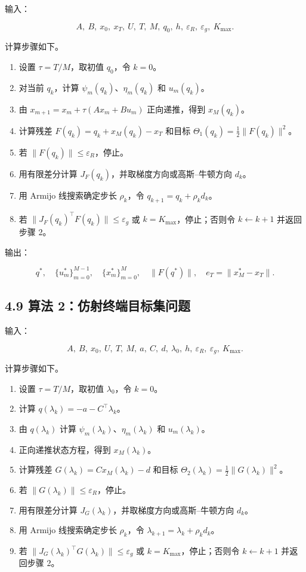 \documentclass[UTF8,a4paper,zihao=-4]{ctexart}
\begin{document}
输入：

\[
A,\ B,\ x_0,\ x_T,\ U,\ T,\ M,\ q_0,\ h,\ \varepsilon_R,\ \varepsilon_g,\ K_{\max}.
\]

计算步骤如下。

\begin{enumerate}
\item 设置 $\tau=T/M$，取初值 $q_0$，令 $k=0$。
\item 对当前 $q_k$，计算 $\psi_m(q_k)$、$\eta_m(q_k)$ 和 $u_m(q_k)$。
\item 由 $x_{m+1}=x_m+\tau(Ax_m+Bu_m)$ 正向递推，得到 $x_M(q_k)$。
\item 计算残差 $F(q_k)=q_k+x_M(q_k)-x_T$ 和目标 $\Theta_1(q_k)=\frac{1}{2}\|F(q_k)\|^2$。
\item 若 $\|F(q_k)\|\leq\varepsilon_R$，停止。
\item 用有限差分计算 $J_F(q_k)$，并取梯度方向或高斯--牛顿方向 $d_k$。
\item 用 Armijo 线搜索确定步长 $\rho_k$，令 $q_{k+1}=q_k+\rho_kd_k$。
\item 若 $\|J_F(q_k)^\top F(q_k)\|\leq\varepsilon_g$ 或 $k=K_{\max}$，停止；否则令 $k\leftarrow k+1$ 并返回步骤 2。
\end{enumerate}

输出：

\[
q^*,\quad \{u_m^*\}_{m=0}^{M-1},\quad \{x_m^*\}_{m=0}^{M},\quad
\|F(q^*)\|,\quad e_T=\|x_M^*-x_T\|.
\]

\subsection{4.9 算法 2：仿射终端目标集问题}

输入：

\[
A,\ B,\ x_0,\ U,\ T,\ M,\ a,\ C,\ d,\ \lambda_0,\ h,\ \varepsilon_R,\ \varepsilon_g,\ K_{\max}.
\]

计算步骤如下。

\begin{enumerate}
\item 设置 $\tau=T/M$，取初值 $\lambda_0$，令 $k=0$。
\item 计算 $q(\lambda_k)=-a-C^\top\lambda_k$。
\item 由 $q(\lambda_k)$ 计算 $\psi_m(\lambda_k)$、$\eta_m(\lambda_k)$ 和 $u_m(\lambda_k)$。
\item 正向递推状态方程，得到 $x_M(\lambda_k)$。
\item 计算残差 $G(\lambda_k)=Cx_M(\lambda_k)-d$ 和目标 $\Theta_2(\lambda_k)=\frac{1}{2}\|G(\lambda_k)\|^2$。
\item 若 $\|G(\lambda_k)\|\leq\varepsilon_R$，停止。
\item 用有限差分计算 $J_G(\lambda_k)$，并取梯度方向或高斯--牛顿方向 $d_k$。
\item 用 Armijo 线搜索确定步长 $\rho_k$，令 $\lambda_{k+1}=\lambda_k+\rho_kd_k$。
\item 若 $\|J_G(\lambda_k)^\top G(\lambda_k)\|\leq\varepsilon_g$ 或 $k=K_{\max}$，停止；否则令 $k\leftarrow k+1$ 并返回步骤 2。
\end{enumerate}
\end{document}
